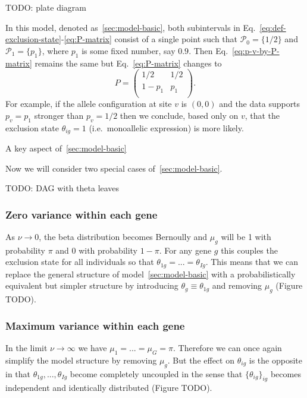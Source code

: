 \documentclass[letterpaper]{article}
\begin{document}
TODO: plate diagram

In this model, denoted as~\ref{sec:model-basic}, both subintervals in
Eq.~\ref{eq:def-exclusion-state}-\ref{eq:P-matrix} consist
of a single point such that \(\mathcal{P}_0 = \{1/2\}\) and \(\mathcal{P}_1 =
\{p_1\}\), where \(p_1\) is some fixed number, say \(0.9\).  Then
Eq.~\ref{eq:p-v-by-P-matrix} remains the same but Eq.~\ref{eq:P-matrix}
changes to
\begin{equation}
\label{eq:P-matrix-M1}
P =
\begin{pmatrix}
1/2 & 1/2 \\
1-p_1 & p_1 \\
\end{pmatrix}.
\end{equation}
For example, if the allele configuration at site \(v\) is \((0,0)\) and the
data supports \(p_v=p_1\) stronger than \(p_v=1/2\) then we conclude, based
only on \(v\), that the exclusion state \(\theta_{ig}=1\) (i.e.~monoallelic
expression) is more likely.

A key aspect of~\ref{sec:model-basic}

Now we will consider two special cases of~\ref{sec:model-basic}.

TODO: DAG with theta leaves

\subsubsection{Zero variance within each gene}
\label{sec:model-basic-nu-0}

As \(\nu\rightarrow 0\), the beta distribution becomes Bernoully and \(\mu_g\) will be 1 with probability \(\pi\) and 0 with
probability \(1-\pi\).  For any gene \(g\) this couples the exclusion state
for all individuals so that \(\theta_{1g}=...=\theta_{Ig}\).  This means that we can
replace the general structure of model~\ref{sec:model-basic} with a
probabilistically equivalent but simpler structure by introducing
\(\theta_g\equiv\theta_{1g}\) and removing \(\mu_g\) (Figure TODO).

\subsubsection{Maximum variance within each gene}
\label{sec:model-basic-nu-infinit}

In the limit \(\nu\rightarrow\infty\) we have \(\mu_1=...=\mu_G=\pi\).
Therefore we can once again simplify the model structure by removing
\(\mu_g\).  But the effect on \(\theta_{ig}\) is the opposite
in that \(\theta_{1g},...,\theta_{Ig}\) become completely uncoupled in the
sense that \(\{\theta_{ig}\}_{ig}\) becomes independent and identically
distributed (Figure TODO).
\end{document}
